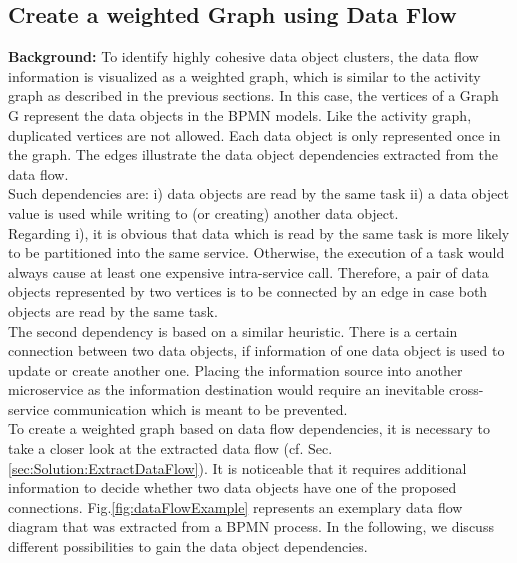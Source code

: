 \subsection{Create a weighted Graph using Data Flow}
\label{sec:Solution:CreateGraphData}
\textbf{Background:} To identify highly cohesive data object clusters, the data flow information is visualized as a weighted graph, which is similar to the activity graph as described in the previous sections. In this case, the vertices of a Graph G represent the data objects in the BPMN models. Like the activity graph, duplicated vertices are not allowed. Each data object is only represented once in the graph. The edges illustrate the data object dependencies extracted from the data flow. \\
Such dependencies are: i) data objects are read by the same task ii) a data object value is used while writing to (or creating) another data object. \\
Regarding i), it is obvious that data which is read by the same task is more likely to be partitioned into the same service. Otherwise, the execution of a task would always cause at least one expensive intra-service call.
Therefore, a pair of data objects represented by two vertices is to be connected by an edge in case both objects are read by the same task.\\
The second dependency is based on a similar heuristic. There is a certain connection between two data objects, if information of one data object is used to update or create another one. Placing the information source into another microservice as the information destination would require an inevitable cross-service communication which is meant to be prevented. \\
To create a weighted graph based on data flow dependencies, it is necessary to take a closer look at the extracted data flow (cf. Sec.\ref{sec:Solution:ExtractDataFlow}). It is noticeable that it requires additional information to decide whether two data objects have one of the proposed connections. Fig.\ref{fig:dataFlowExample} represents an exemplary data flow diagram that was extracted from a BPMN process. In the following, we discuss different possibilities to gain the data object dependencies.


